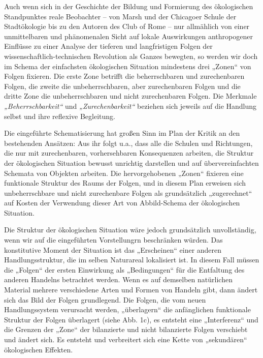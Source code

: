 \documentclass[11pt,a4paper]{article}
\begin{document}
Auch wenn sich in der Geschichte der Bildung und Formierung des ökologischen
Standpunktes reale Beobachter -- von Marsh und der Chicagoer Schule der
Stadtökologie bis zu den Autoren des Club of Rome -- nur allmählich von einer
unmittelbaren und phänomenalen Sicht auf lokale Auswirkungen anthropogener
Einflüsse zu einer Analyse der tieferen und langfristigen Folgen der
wissenschaftlich-technischen Revolution als Ganzes bewegten, so werden wir
doch im Schema der einfachsten ökologischen Situation mindestens drei „Zonen“
von Folgen fixieren. Die erste Zone betrifft die beherrschbaren und
zurechenbaren Folgen, die zweite die unbeherrschbaren, aber zurechenbaren
Folgen und die dritte Zone die unbeherrschbaren und nicht zurechenbaren
Folgen.  Die Merkmale \emph{„Beherrschbarkeit“} und \emph{„Zurechenbarkeit“}
beziehen sich jeweils auf die Handlung selbst und ihre reflexive Begleitung.

Die eingeführte Schematisierung hat großen Sinn im Plan der Kritik an den
bestehenden Ansätzen: Aus ihr folgt u.a., dass alle die Schulen und
Richtungen, die nur mit zurechenbaren, vorhersehbaren Konsequenzen arbeiten,
die Struktur der ökologischen Situation bewusst unrichtig darstellen und auf
übervereinfachten Schemata von Objekten arbeiten. Die hervorgehobenen „Zonen“
fixieren eine funktionale Struktur des Raums der Folgen, und in diesem Plan
erweisen sich unbeherrschbare und nicht zurechenbare Folgen als grundsätzlich
„zugerechnet“ auf Kosten der Verwendung dieser Art von Abbild-Schema der
ökologischen Situation.

Die Struktur der ökologischen Situation wäre jedoch grundsätzlich
unvollständig, wenn wir auf die eingeführten Vorstellungrn beschränken
würden. Das konstitutive Moment der Situation ist das „Erscheinen“ einer
anderen Handlungsstruktur, die im selben Naturareal lokalisiert ist. In diesem
Fall müssen die „Folgen“ der ersten Einwirkung als „Bedingungen“ für die
Entfaltung des anderen Handelns betrachtet werden. Wenn es auf demselben
natürlichen Material mehrere verschiedene Arten und Formen von Handeln gibt,
dann ändert sich das Bild der Folgen grundlegend. Die Folgen, die vom neuen
Handlungssystem verursacht werden, „überlagern“ die anfänglichen funktionale
Struktur der Folgen überlagert (siehe Abb. 1c), es entsteht eine „Interferenz“
und die Grenzen der „Zone“ der bilanzierte und nicht bilanzierte Folgen
verschiebt und ändert sich. Es entsteht und verbreitert sich eine Kette von
„sekundären“ ökologischen Effekten.
\end{document}
